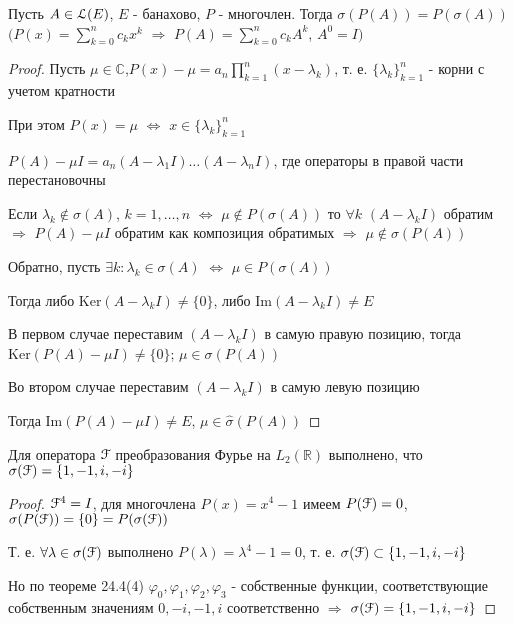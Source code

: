 \documentclass[a4paper,12pt]{report}
\begin{document}
\begin{prop}
Пусть $A\in\EuScript L(E)$, $E$ - банахово, $P$ - многочлен. Тогда $\sigma(P(A))=P(\sigma(A))$ $\bigl(P(x)=\sum\limits_{k=0}^n c_kx^k$ $\Rightarrow$ $P(A)=\sum\limits_{k=0}^n c_k A^k$, $A^0=I\bigr)$
\end{prop}
\begin{proof}
Пусть $\mu\in\mathbb C$,$P(x)-\mu=a_n\prod\limits_{k=1}^n(x-\lambda_k)$, т. е. $\{\lambda_k\}_{k=1}^n$ - корни с учетом кратности

При этом $P(x)=\mu$ $\Leftrightarrow$ $x\in\{\lambda_k\}_{k=1}^n$

$P(A)-\mu I=a_n(A-\lambda_1 I)\ldots(A-\lambda_n I)$, где операторы в правой части перестановочны

Если $\lambda_k\notin\sigma(A)$, $k=1,\ldots,n$ $\Leftrightarrow$ $\mu\notin P(\sigma(A))$ то $\forall k$ $(A-\lambda_kI)$ обратим\\$\Rightarrow$ $P(A)-\mu I$ обратим как композиция обратимых $\Rightarrow$ $\mu\notin\sigma(P(A))$

Обратно, пусть $\exists k\colon\lambda_k\in\sigma(A)$ $\Leftrightarrow$ $\mu\in P(\sigma(A))$

Тогда либо $\mathrm{Ker}(A-\lambda_k I)\ne\{0\}$, либо $\mathrm{Im}(A-\lambda_k I)\ne E$

В первом случае переставим $(A-\lambda_k I)$ в самую правую позицию, тогда $\mathrm{Ker}(P(A)-\mu I)\ne\{0\}$; $\mu\in\sigma(P(A))$

Во втором случае переставим $(A-\lambda_k I)$ в самую левую позицию

Тогда $\mathrm{Im}(P(A)-\mu I)\ne E$, $\mu\in\hat\sigma(P(A))$
\end{proof}


\begin{cons}
Для оператора $\EuScript F$ преобразования Фурье на $L_2(\mathbb R)$ выполнено, что $\sigma(\EuScript F)=\{1,-1,i,-i\}$
\end{cons}
\begin{proof}
$\EuScript F^4=I$, для многочлена $P(x)=x^4-1$ имеем $P(\EuScript F)=0$, $\sigma(P(\EuScript F))=\{0\}=P(\sigma(\EuScript F))$

Т. е. $\forall\lambda\in\sigma(\EuScript F)$ выполнено $P(\lambda)=\lambda^4-1=0$, т. е. $\sigma(\EuScript F)\subset\{1,-1,i,-i\}$

Но по теореме 24.4(4) $\varphi_0,\varphi_1,\varphi_2,\varphi_3$ - собственные функции, соответствующие собственным значениям $0,-i,-1,i$ соответственно $\Rightarrow$ $\sigma(\EuScript F)=\{1,-1,i,-i\}$
\end{proof}
\end{document}
